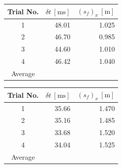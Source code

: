 \documentclass[a4paper]{article}
\begin{document}
\begin{figure}[h]
	\begin{minipage}{0.45\textwidth}
		\centering
		\begin{tabular}{crr}
			\toprule
			Trial No. & $\delta t \ [\si{\milli\second}]$ & $(s_f)_x \ [\si{\meter}]$\\
			\midrule
			1 & 48.01 & 1.025\\
			2 & 46.70 & 0.985\\
			3 & 44.60 & 1.010\\
			4 & 46.42 & 1.040\\
			\midrule
			Average & & \\
			\bottomrule
		\end{tabular}
	\end{minipage}
	\hspace{1cm}
	\begin{minipage}{0.45\textwidth}
		\centering
		\begin{tabular}{crr}
			\toprule
			Trial No. & $\delta t \ [\si{\milli\second}]$ & $(s_f)_x \ [\si{\meter}]$\\
			\midrule
			1 & 35.66 & 1.470\\
			2 & 35.16 & 1.485\\
			3 & 33.68 & 1.520\\
			4 & 34.04 & 1.525\\
			\midrule
			Average & & \\
			\bottomrule
		\end{tabular}
	\end{minipage}
\end{figure}
\end{document}
